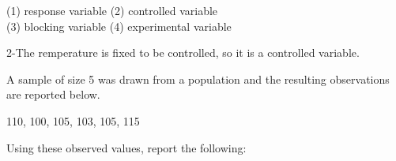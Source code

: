 \documentclass[addpoints]{examsetup}
\begin{document}
\begin{questions}
(1) response variable\hspace{1cm} (2) controlled variable\\
(3) blocking variable\hspace{1cm} (4) experimental variable\\
\begin{solution}
2-The remperature is fixed to be controlled, so it is a controlled variable.
\end{solution}



\pagebreak

\question

A sample of size 5 was drawn from a population and the resulting observations are reported below. 
\begin{center}
110, 100, 105, 103, 105, 115
\end{center}
Using these observed values, report the following:
\vspace{1cm}

\end{questions}
\end{document}
